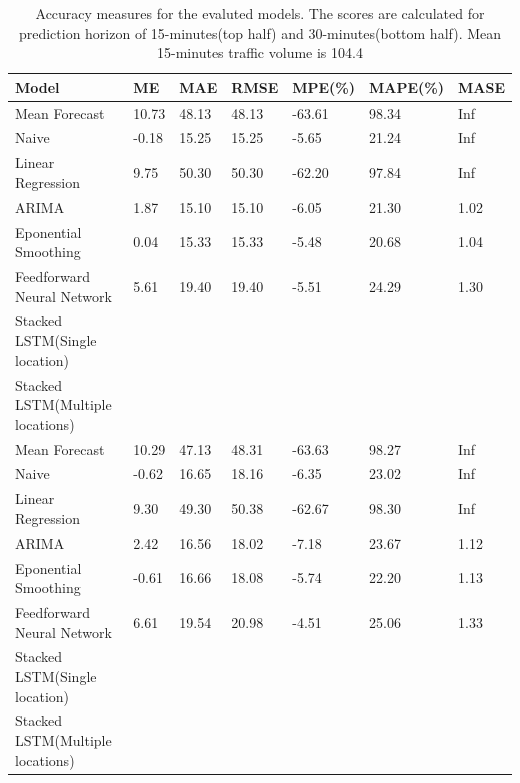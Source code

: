 \begin{table}
\centering
    \begin{tabular}{| l | l | l| l | l | l | l|} \hline
        Model                            & ME & MAE & RMSE & MPE(\%) & MAPE(\%) & MASE \\ \hline
        Mean Forecast                    & 10.73 & 48.13 & 48.13 & -63.61 & 98.34 & Inf \\ \hline
        Naive                            & -0.18 & 15.25 & 15.25 & -5.65 & 21.24 & Inf \\ \hline
        Linear Regression                & 9.75 & 50.30 & 50.30 & -62.20 & 97.84 & Inf \\ \hline
        ARIMA                            & 1.87 & 15.10 & 15.10 & -6.05 & 21.30 & 1.02 \\ \hline
        Eponential Smoothing             & 0.04 & 15.33 & 15.33 & -5.48 & 20.68 & 1.04 \\ \hline
        Feedforward Neural Network       & 5.61 & 19.40 & 19.40 & -5.51 & 24.29 & 1.30 \\ \hline
        Stacked LSTM(Single location)    &  &  &  &  &  &  \\ \hline
        Stacked LSTM(Multiple locations) &  &  &  &  &  &  \\
        \hline \hline
        Mean Forecast                    & 10.29 & 47.13 & 48.31 & -63.63 & 98.27 & Inf \\ \hline
        Naive                            & -0.62 & 16.65 & 18.16 & -6.35 & 23.02 & Inf \\ \hline
        Linear Regression                & 9.30 & 49.30 & 50.38 & -62.67 & 98.30 & Inf \\ \hline
        ARIMA                            & 2.42 & 16.56 & 18.02 & -7.18 & 23.67 & 1.12 \\ \hline
        Eponential Smoothing             & -0.61 & 16.66 & 18.08 & -5.74 & 22.20 & 1.13 \\ \hline
        Feedforward Neural Network       & 6.61 & 19.54 & 20.98 & -4.51 & 25.06 & 1.33 \\ \hline
        Stacked LSTM(Single location)    &  &  &  &  &  &  \\ \hline
        Stacked LSTM(Multiple locations) &  &  &  &  &  &  \\ \hline
    \end{tabular}
    \caption[Model comparisons]{Accuracy measures for the evaluted models. The scores are
    calculated for prediction horizon of 15-minutes(top half) and 30-minutes(bottom half). Mean
    15-minutes traffic volume is 104.4}
    \label{table:accuracyScores}
\end{table}
